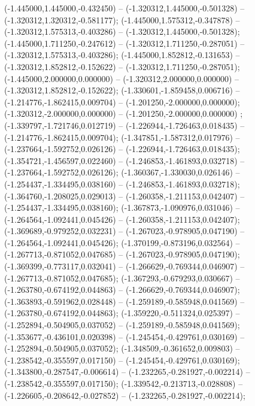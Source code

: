  (-1.445000,1.445000,-0.432450) -- (-1.320312,1.445000,-0.501328) -- (-1.320312,1.320312,-0.581177);
 (-1.445000,1.575312,-0.347878) -- (-1.320312,1.575313,-0.403286) -- (-1.320312,1.445000,-0.501328);
 (-1.445000,1.711250,-0.247612) -- (-1.320312,1.711250,-0.287051) -- (-1.320312,1.575313,-0.403286);
 (-1.445000,1.852812,-0.131653) -- (-1.320312,1.852812,-0.152622) -- (-1.320312,1.711250,-0.287051);
 (-1.445000,2.000000,0.000000) -- (-1.320312,2.000000,0.000000) -- (-1.320312,1.852812,-0.152622);
 (-1.330601,-1.859458,0.006716) -- (-1.214776,-1.862415,0.009704) -- (-1.201250,-2.000000,0.000000);
 (-1.320312,-2.000000,0.000000) -- (-1.201250,-2.000000,0.000000) ;
 (-1.339797,-1.721746,0.012719) -- (-1.226944,-1.726463,0.018435) -- (-1.214776,-1.862415,0.009704);
 (-1.347851,-1.587312,0.017976) -- (-1.237664,-1.592752,0.026126) -- (-1.226944,-1.726463,0.018435);
 (-1.354721,-1.456597,0.022460) -- (-1.246853,-1.461893,0.032718) -- (-1.237664,-1.592752,0.026126);
 (-1.360367,-1.330030,0.026146) -- (-1.254437,-1.334495,0.038160) -- (-1.246853,-1.461893,0.032718);
 (-1.364760,-1.208025,0.029013) -- (-1.260358,-1.211153,0.042407) -- (-1.254437,-1.334495,0.038160);
 (-1.367873,-1.090976,0.031046) -- (-1.264564,-1.092441,0.045426) -- (-1.260358,-1.211153,0.042407);
 (-1.369689,-0.979252,0.032231) -- (-1.267023,-0.978905,0.047190) -- (-1.264564,-1.092441,0.045426);
 (-1.370199,-0.873196,0.032564) -- (-1.267713,-0.871052,0.047685) -- (-1.267023,-0.978905,0.047190);
 (-1.369399,-0.773117,0.032041) -- (-1.266629,-0.769344,0.046907) -- (-1.267713,-0.871052,0.047685);
 (-1.367293,-0.679293,0.030667) -- (-1.263780,-0.674192,0.044863) -- (-1.266629,-0.769344,0.046907);
 (-1.363893,-0.591962,0.028448) -- (-1.259189,-0.585948,0.041569) -- (-1.263780,-0.674192,0.044863);
 (-1.359220,-0.511324,0.025397) -- (-1.252894,-0.504905,0.037052) -- (-1.259189,-0.585948,0.041569);
 (-1.353677,-0.436101,0.020398) -- (-1.245454,-0.429761,0.030169) -- (-1.252894,-0.504905,0.037052);
 (-1.348509,-0.361652,0.009803) -- (-1.238542,-0.355597,0.017150) -- (-1.245454,-0.429761,0.030169);
 (-1.343800,-0.287547,-0.006614) -- (-1.232265,-0.281927,-0.002214) -- (-1.238542,-0.355597,0.017150);
 (-1.339542,-0.213713,-0.028808) -- (-1.226605,-0.208642,-0.027852) -- (-1.232265,-0.281927,-0.002214);
